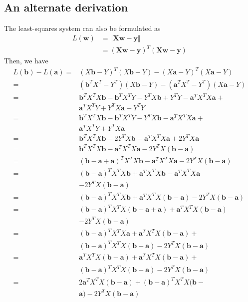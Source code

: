 \documentclass[sigconf,authordraft]{acmart}
\begin{document}
\subsection{An alternate derivation}
The least-squares system can also be formulated as 
\[
    \begin{aligned} L(\textbf{w}) &= \left\Vert \textbf{X}\textbf{w} - \textbf{y} \right\Vert \\ &= (\textbf{X}\textbf{w} - \textbf{y})^T (\textbf{X}\textbf{w} - \textbf{y}) \end{aligned}
\]
Then, we have
\[
    \begin{aligned}
			L(\textbf{b}) - L(\textbf{a}) =& \left( X\textbf{b} - Y \right)^T (X\textbf{b} - Y) - (X\textbf{a} - Y)^T (X\textbf{a} - Y) \\
			=& (\textbf{b}^T X^T - Y^T)(X\textbf{b} - Y) - (\textbf{a}^T X^T - Y^T)(X\textbf{a} - Y) \\
			=& \textbf{b}^T X^T X \textbf{b} - \textbf{b}^T X^T Y - Y^T X\textbf{b} + Y^T Y - \textbf{a}^T X^T X\textbf{a} + \\ &\textbf{a}^T X^T Y + Y^T X\textbf{a} - Y^T Y \\
			=& \textbf{b}^T X^T X \textbf{b} - \textbf{b}^T X^T Y - Y^T X\textbf{b} - \textbf{a}^T X^T X\textbf{a} + \\
			& \textbf{a}^T X^T Y + Y^T X\textbf{a} \\
			=& \textbf{b}^T X^T X \textbf{b} - 2Y^T X\textbf{b} - \textbf{a}^T X^T X\textbf{a} + 2Y^T X\textbf{a} \\
			=& \textbf{b}^T X^T X \textbf{b} - \textbf{a}^T X^T X\textbf{a} - 2Y^T X(\textbf{b} - \textbf{a}) \\
			=& (\textbf{b} - \textbf{a} + \textbf{a})^T X^T X \textbf{b} - \textbf{a}^T X^T X\textbf{a} - 2Y^T X(\textbf{b} - \textbf{a}) \\
			=& (\textbf{b} - \textbf{a})^T X^T X \textbf{b} + \textbf{a}^T X^T X \textbf{b} - \textbf{a}^T X^T X\textbf{a} \\
			& - 2Y^T X(\textbf{b} - \textbf{a}) \\
			=& (\textbf{b} - \textbf{a})^T X^T X \textbf{b} + \textbf{a}^T X^T X (\textbf{b} - \textbf{a}) - 2Y^T X(\textbf{b} - \textbf{a}) \\
			=& (\textbf{b} - \textbf{a})^T X^T X (\textbf{b} - \textbf{a} + \textbf{a}) + \textbf{a}^T X^T X (\textbf{b} - \textbf{a}) \\
			& - 2Y^T X(\textbf{b} - \textbf{a}) \\
			=& (\textbf{b} - \textbf{a})^T X^T X\textbf{a} + \textbf{a}^T X^T X(\textbf{b} - \textbf{a}) + \\
			& (\textbf{b} - \textbf{a})^T X^T X(\textbf{b} - \textbf{a}) - 2Y^T X(\textbf{b} - \textbf{a}) \\
			=& \textbf{a}^T X^T X (\textbf{b} - \textbf{a}) + \textbf{a}^T X^T X(\textbf{b} - \textbf{a}) + \\
			& (\textbf{b} - \textbf{a})^T X^T X(\textbf{b} - \textbf{a}) - 2Y^T X(\textbf{b} - \textbf{a}) \\
			=& 2\textbf{a}^T X^T X(\textbf{b} - \textbf{a}) + (\textbf{b} - \textbf{a})^T X^T X(\textbf{b} - \\
			& \textbf{a}) - 2Y^T X(\textbf{b} - \textbf{a})
		\end{aligned}
\]
\end{document}
